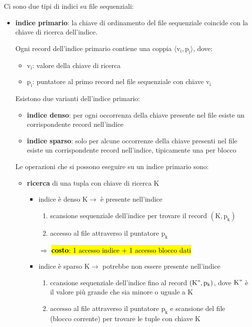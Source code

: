 Ci sono due tipi di indici su file sequenziali:
\begin{itemize}[label=$\triangleright$, itemsep=\medskipamount]
  \item \textbf{indice primario}: la chiave di ordinamento del file sequenziale coincide con la chiave di ricerca dell’indice.
  
  Ogni record dell’indice primario contiene una coppia $\mathrm{\langle v_i, p_i\rangle}$, dove:
  \begin{itemize}
    \item $\mathrm{v_i}$: valore della chiave di ricerca
    \item $\mathrm{p_i}$: puntatore al primo record nel file sequenziale con chiave $\mathrm{v_i}$
  \end{itemize}

  \smallskip
  Esistono due varianti dell'indice primario:
  \begin{itemize}[itemsep=\smallskipamount]
    \item \textbf{indice denso}: per ogni occorrenza della chiave presente nel file esiste un corrispondente record nell'indice
    \item \textbf{indice sparso}: solo per alcune occorrenze della chiave presenti nel file esiste un corrispondente record nell’indice, tipicamente una per blocco
  \end{itemize}

  \smallskip
  Le operazioni che si possono eseguire su un indice primario sono:
  \begin{itemize}[label=$\diamond$, itemsep=\medskipamount]
    \item \textbf{ricerca} di una tupla con chiave di ricerca K
    \begin{itemize}[label=$\circ$, itemsep=\smallskipamount]
      \item indice è denso $\mathrm{K} \rightarrow$ è presente nell'indice
      \begin{enumerate}[itemsep=\smallskipamount]
        \item scansione sequenziale dell'indice per trovare il record $\mathrm{(K, p_k)}$
        \item accesso al file attraverso il puntatore $\mathrm{p_k}$
      \end{enumerate}

      $\Rightarrow$ \hl{\textbf{costo}: 1 accesso indice + 1 accesso blocco dati}
      \item indice è sparso $\mathrm{K \rightarrow}$ potrebbe non essere presente nell'indice
      \begin{enumerate}[itemsep=\smallskipamount]
        \item ccansione sequenziale dell'indice fino al record $\mathrm{(K", p_k)}$, dove $\mathrm{K"}$ è il valore più grande che sia minore o uguale a $\mathrm{K}$
        \item accesso al file attraverso il puntatore $\mathrm{p_k}$ e scansione del file (blocco corrente) per trovare le tuple con chiave $\mathrm{K}$
      \end{enumerate}


\end{itemize}
\end{itemize}
\end{itemize}
